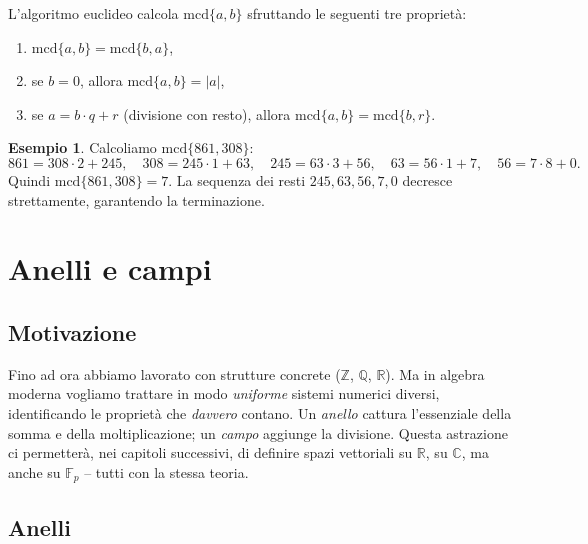 \documentclass[11pt, a4paper]{book}
\theoremstyle{definition}
\newtheorem{esempio}[definizione]{Esempio}
\theoremstyle{plain}
\theoremstyle{remark}
\newcommand{\Z}{\mathbb{Z}}
\newcommand{\Q}{\mathbb{Q}}
\newcommand{\R}{\mathbb{R}}
\newcommand{\C}{\mathbb{C}}
\newcommand{\mcd}{\mathrm{mcd}}
\begin{document}
L'algoritmo euclideo calcola $\mcd\{a,b\}$ sfruttando le seguenti tre proprietà:
\begin{enumerate}
  \item[(F1)] $\mcd\{a,b\} = \mcd\{b,a\}$,
  \item[(F2)] se $b = 0$, allora $\mcd\{a,b\} = |a|$,
  \item[(F3)] se $a = b \cdot q + r$ (divisione con resto), allora $\mcd\{a,b\} = \mcd\{b,r\}$.
\end{enumerate}

\begin{exbox}
\begin{esempio}
Calcoliamo $\mcd\{861, 308\}$:
\[
  861 = 308 \cdot 2 + 245, \quad
  308 = 245 \cdot 1 + 63, \quad
  245 = 63 \cdot 3 + 56, \quad
  63 = 56 \cdot 1 + 7, \quad
  56 = 7 \cdot 8 + 0.
\]
Quindi $\mcd\{861, 308\} = 7$. La sequenza dei resti $245, 63, 56, 7, 0$ decresce strettamente, garantendo la terminazione.
\end{esempio}
\end{exbox}

\section{Anelli e campi}
\label{sec:anelliCampi}

\subsection{Motivazione}

Fino ad ora abbiamo lavorato con strutture concrete ($\Z$, $\Q$, $\R$). Ma in algebra moderna vogliamo trattare in modo \emph{uniforme} sistemi numerici diversi, identificando le proprietà che \emph{davvero} contano. Un \emph{anello} cattura l'essenziale della somma e della moltiplicazione; un \emph{campo} aggiunge la divisione. Questa astrazione ci permetterà, nei capitoli successivi, di definire spazi vettoriali su $\R$, su $\C$, ma anche su $\mathbb{F}_p$ -- tutti con la stessa teoria.

\subsection{Anelli}
\end{document}
